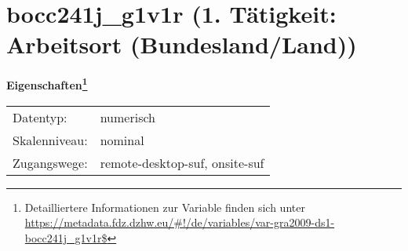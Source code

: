 
    \setcounter{footnote}{0}

    \vspace*{-1.8cm}
	\section{bocc241j\_g1v1r (1. Tätigkeit: Arbeitsort (Bundesland/Land))}
	\label{section:bocc241j_g1v1r}



    \vspace*{0.5cm}
    \noindent\textbf{Eigenschaften\footnote{Detailliertere Informationen zur Variable finden sich unter
		\url{https://metadata.fdz.dzhw.eu/\#!/de/variables/var-gra2009-ds1-bocc241j_g1v1r$}}}\\
	\begin{tabularx}{\hsize}{@{}lX}
	Datentyp: & numerisch \\
	Skalenniveau: & nominal \\
	Zugangswege: &
	  remote-desktop-suf, 
	  onsite-suf
 \\
    \end{tabularx}



